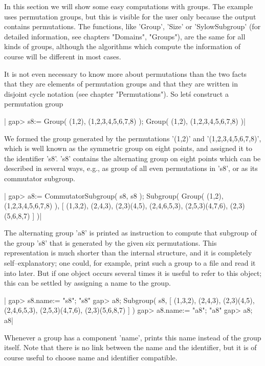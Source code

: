In this  section  we will show some  easy computations with  groups.  The
example uses permutation groups,  but this  is visible  for the user only
because the output  contains  permutations.  The functions, like 'Group',
'Size'   or  'SylowSubgroup'  (for  detailed  information,  see  chapters
"Domains", "Groups"), are the same for all kinds of groups, although  the
algorithms which  compute the  information of course will be different in
most cases.

It is not even necessary  to know more  about permutations  than  the two
facts that  they  are  elements of  permutation groups and that  they are
written  in  disjoint cycle  notation (see chapter  "Permutations").   So
let\'s construct a permutation group\:

|    gap> s8:= Group( (1,2), (1,2,3,4,5,6,7,8) );
    Group( (1,2), (1,2,3,4,5,6,7,8) )|

We   formed  the  group  generated  by   the  permutations  '(1,2)'   and
'(1,2,3,4,5,6,7,8)',  which is well known as the symmetric group on eight
points,  and  assigned  it  to the  identifier 's8'.   's8' contains  the
alternating group on eight points which can be described in several ways,
e.g., as group of  all even permutations in  's8',  or  as its commutator
subgroup.

|    gap> a8:= CommutatorSubgroup( s8, s8 );
    Subgroup( Group( (1,2), (1,2,3,4,5,6,7,8) ),
    [ (1,3,2), (2,4,3), (2,3)(4,5), (2,4,6,5,3), (2,5,3)(4,7,6),
      (2,3)(5,6,8,7) ] )|

The  alternating group 'a8'  is printed as  instruction  to  compute that
subgroup   of  the  group  's8'  that  is  generated  by  the  given  six
permutations.   This representation  is  much shorter than  the  internal
structure,  and  it  is  completely  self--explanatory;  one  could,  for
example, print such a group to a file and read it into {\GAP} later.  But
if one object occurs several times it is useful to refer  to this object;
this can be settled by assigning a name to the group.

|    gap> s8.name:= "s8";
    "s8"
    gap> a8;
    Subgroup( s8, [ (1,3,2), (2,4,3), (2,3)(4,5), (2,4,6,5,3),
      (2,5,3)(4,7,6), (2,3)(5,6,8,7) ] )
    gap> a8.name:= "a8";
    "a8"
    gap> a8;
    a8|

Whenever a group has a component 'name',  {\GAP} prints this name instead
of the group itself.  Note that there is no link between the name and the
identifier, but  it is  of  course  useful to choose name and  identifier
compatible.

